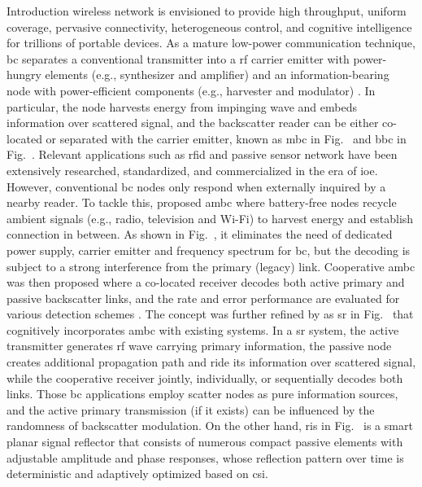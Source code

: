 \documentclass[journal,12pt,onecolumn,draftclsnofoot]{IEEEtran}
\theoremstyle{remark}
\begin{document}
\glsresetall

\begin{section}{Introduction}
	 wireless network is envisioned to provide high throughput, uniform coverage, pervasive connectivity, heterogeneous control, and cognitive intelligence for trillions of portable devices.
	As a mature low-power communication technique, \gls{bc} separates a conventional transmitter into a \gls{rf} carrier emitter with power-hungry elements (e.g., synthesizer and amplifier) and an information-bearing node with power-efficient components (e.g., harvester and modulator) \cite{Boyer2014}.
	In particular, the node harvests energy from impinging wave and embeds information over scattered signal, and the backscatter reader can be either co-located or separated with the carrier emitter, known as \gls{mbc} in Fig.~ and \gls{bbc} in Fig.~.
	Relevant applications such as \gls{rfid} \cite{Dobkin2012,Landt2005} and passive sensor network \cite{Vannucci2008,Assimonis2016} have been extensively researched, standardized, and commercialized in the era of \gls{ioe}.
	However, conventional \gls{bc} nodes only respond when externally inquired by a nearby reader.
	To tackle this, \cite{Liu2013b} proposed \gls{ambc} where battery-free nodes recycle ambient signals (e.g., radio, television and Wi-Fi) to harvest energy and establish connection in between.
	As shown in Fig.~, it eliminates the need of dedicated power supply, carrier emitter and frequency spectrum for \gls{bc}, but the decoding is subject to a strong interference from the primary (legacy) link.
	Cooperative \gls{ambc} was then proposed where a co-located receiver decodes both active primary and passive backscatter links, and the rate and error performance are evaluated for various detection schemes \cite{Yang2018}.
	The concept was further refined by \cite{Liang2020} as \gls{sr} in Fig.~ that cognitively incorporates \gls{ambc} with existing systems.
	In a \gls{sr} system, the active transmitter generates \gls{rf} wave carrying primary information, the passive node creates additional propagation path and ride its information over scattered signal, while the cooperative receiver jointly, individually, or sequentially decodes both links.
	Those \gls{bc} applications employ scatter nodes as pure information sources, and the active primary transmission (if it exists) can be influenced by the randomness of backscatter modulation.
	On the other hand, \gls{ris} in Fig.~ is a smart planar signal reflector that consists of numerous compact passive elements with adjustable amplitude and phase responses, whose reflection pattern over time is deterministic and adaptively optimized based on \gls{csi}.

\end{section}
\end{document}
